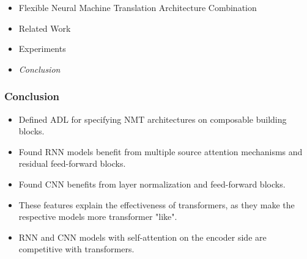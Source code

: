 \begin{frame}

\begin{itemize}
    \item Flexible Neural Machine Translation Architecture Combination
    \item Related Work
    \item Experiments
    \item \emph{\color{UOYellow}Conclusion}
\end{itemize}

\end{frame}

\begin{frame}
    \frametitle{Conclusion}
    \begin{itemize}
        \item Defined ADL for specifying NMT architectures on composable
            building blocks.
        \item Found RNN models benefit from multiple source attention mechanisms
            and residual feed-forward blocks.
        \item Found CNN benefits from layer normalization and feed-forward
            blocks.
        \item These features explain the effectiveness of transformers, as they
            make the respective models more transformer "like". 
        \item RNN and CNN models with self-attention on the encoder side are
            competitive with transformers. 
    \end{itemize}
\end{frame}

